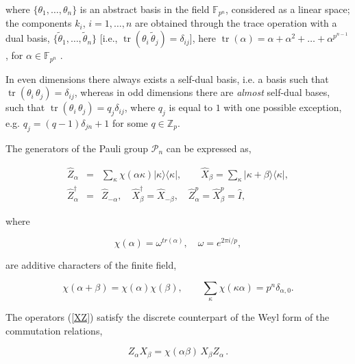 \documentclass[quantumrep,article,submit,pdftex,moreauthors]{Definitions/mdpi}
\DeclareMathOperator{\tr}{tr}
\begin{document}
where $\{\theta_{1},\ldots,\theta_{n}\}$ is an abstract basis in the field
$\mathbb{F}_{p^{n}}$, considered as a linear space; the components $k_{i}$,
$i=1,\ldots,n$ are obtained through the trace operation with a dual basis,
$\{\tilde{\theta}_{1},\ldots,\tilde{\theta}_{n}\}$ [i.e.,
$\tr(\theta_{i}\,\tilde{\theta}_{j})=\delta_{ij}$], here $\tr(\alpha)=\alpha
+\alpha^{2}+\ldots+\alpha^{p^{n-1}}$, for $\alpha \in \mathbb{F}_{p^{n}}$
\cite{FF}.

In even dimensions there always exists a self-dual basis, i.e. a basis such that
$\tr(\theta_{i}\,\theta_{j})=\delta_{ij}$, whereas in odd dimensions there are
\textit{almost} self-dual bases, such that
$\tr(\theta_{i}\,\theta_{j})=q_{j}\delta_{ij}$, where $q_{j}$ is equal to $1$
with one possible exception, e.g. $q_{j}=(q-1)\delta_{jn}+1$ for some $q \in
\mathbb{Z}_p$.

The generators of the Pauli group $\mathcal{P}_{n}$ can be expressed as,

\begin{eqnarray}
  \hat{Z}_{\alpha}
  &=& \sum_{\kappa} \chi\left( \alpha\kappa \right)
  |\kappa\rangle \langle\kappa|,
  \qquad \hat{X}_{\beta}
  = \sum_{\kappa} |\kappa + \beta\rangle \langle\kappa|,
  \label{XZ} \\
  \hat{Z}_{\alpha }^{\dagger}
  &=& \hat{Z}_{-\alpha}, \quad \hat{X}_{\beta }^{\dagger}
  = \hat{X}_{-\beta}, \quad \hat{Z}_{\alpha}^{p}
  = \hat{X}_{\beta}^{p} = \hat{I},
\end{eqnarray}

where

\begin{equation*}
  \chi \left( \alpha \right)
  = \omega^{tr\left( \alpha \right)},
  \quad \omega = e^{2\pi i / p},
\end{equation*}

are additive characters of the finite field,

\begin{equation*}
  \chi\left( \alpha+\beta \right)
  = \chi\left( \alpha \right) \chi\left( \beta \right),
  \qquad \sum_{\kappa }\chi\left( \kappa\alpha \right)
  = p^{n}\delta_{\alpha,0}.
\end{equation*}

The operators (\ref{XZ}) satisfy the discrete counterpart of the Weyl form of
the commutation relations,

\begin{equation}
  Z_{\alpha}X_{\beta }
  = \chi \left( \alpha\beta \right) \, X_{\beta }Z_{\alpha} \,.
  \label{commutation_relation}
\end{equation}
\end{document}
